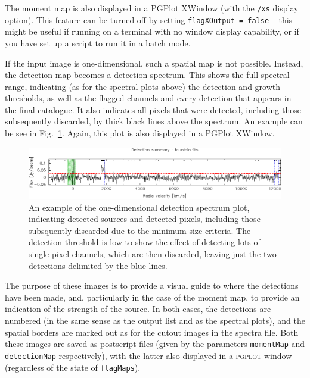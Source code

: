 The moment map is also displayed in a PGPlot XWindow (with the
\texttt{/xs} display option). This feature can be turned off by
setting \texttt{flagXOutput = false} -- this might be useful if
running \duchamp on a terminal with no window display capability, or
if you have set up a script to run it in a batch mode.

If the input image is one-dimensional, such a spatial map is not
possible. Instead, the detection map becomes a detection
spectrum. This shows the full spectral range, indicating (as for the
spectral plots above) the detection and growth thresholds, as well as
the flagged channels and every detection that appears in the final
catalogue. It also indicates all pixels that were detected, including
those subsequently discarded, by thick black lines above the
spectrum. An example can be see in
Fig.~\ref{fig-1D-detection-spectrum}. Again, this plot is also
displayed in a PGPlot XWindow.

\begin{figure}[!t]
  \begin{center}
    \includegraphics[width=\textwidth]{example_detection_spectrum}
  \end{center}
  \caption{\footnotesize An example of the one-dimensional detection
    spectrum plot, indicating detected sources and detected pixels,
    including those subsquently discarded due to the minimum-size
    criteria. The detection threshold is low to show the effect of
    detecting lots of single-pixel channels, which are then discarded,
    leaving just the two detections delimited by the blue lines.}
  \label{fig-1D-detection-spectrum}
\end{figure}



The purpose of these images is to provide a visual guide to where the
detections have been made, and, particularly in the case of the moment
map, to provide an indication of the strength of the source. In both
cases, the detections are numbered (in the same sense as the output
list and as the spectral plots), and the spatial borders are marked
out as for the cutout images in the spectra file. Both these images
are saved as postscript files (given by the parameters
\texttt{momentMap} and \texttt{detectionMap} respectively), with the
latter also displayed in a \textsc{pgplot} window (regardless of the
state of \texttt{flagMaps}).

